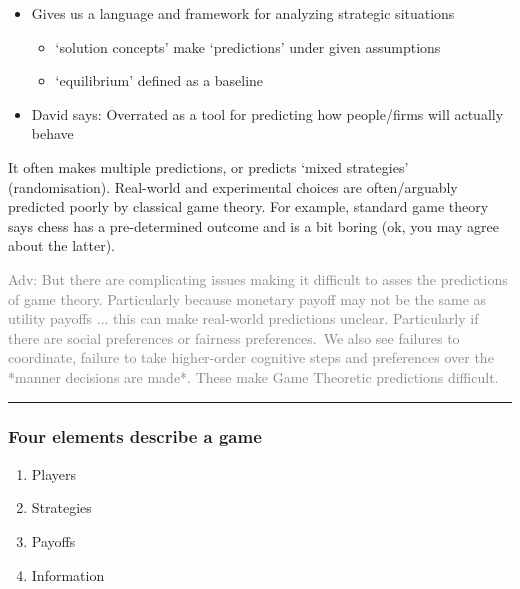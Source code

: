\documentclass[]{article}
\providecommand{\tightlist}{%
  \setlength{\itemsep}{0pt}\setlength{\parskip}{0pt}}
\begin{document}
\begin{itemize}
\tightlist
\item
  Gives us a language and framework for analyzing strategic situations

  \begin{itemize}
  \tightlist
  \item
    `solution concepts' make `predictions' under given assumptions
  \item
    `equilibrium' defined as a baseline
  \end{itemize}
\item
  David says: Overrated as a tool for predicting how people/firms will
  actually behave
\end{itemize}

It often makes multiple predictions, or predicts `mixed strategies'
(randomisation). Real-world and experimental choices are often/arguably
predicted poorly by classical game theory. For example, standard game
theory says chess has a pre-determined outcome and is a bit boring (ok,
you may agree about the latter).

\textcolor{gray}{Adv: But there are complicating issues making it difficult to asses the predictions of game theory.
Particularly because monetary payoff may not be the same as utility payoffs ... this can make real-world predictions unclear.
Particularly if there are social preferences or fairness preferences.\
We also see failures to coordinate,
failure to take higher-order cognitive steps
and preferences over the *manner decisions are made*.
These make Game Theoretic predictions difficult.}

\begin{center}\rule{0.5\linewidth}{\linethickness}\end{center}

\hypertarget{four-elements-describe-a-game}{%
\subsubsection{Four elements describe a
game}\label{four-elements-describe-a-game}}

\begin{enumerate}
\def\labelenumi{\arabic{enumi}.}
\tightlist
\item
  Players
\item
  Strategies
\item
  Payoffs
\item
  Information
\end{enumerate}
\end{document}
